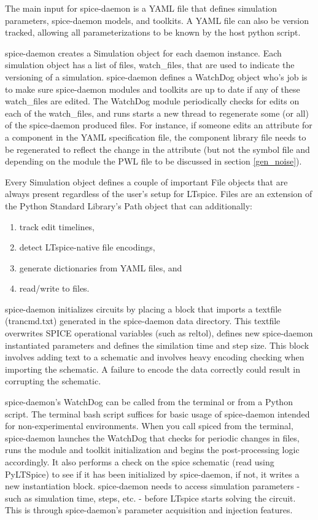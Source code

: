 \documentclass[]{article}
\newcommand{\todoidea}[2][]{}
\newcommand{\cf}[1]{\textsf{#1}}
\begin{document}
The main input for spice-daemon is a YAML file that defines simulation parameters, spice-daemon models, and
toolkits. A YAML file can also be version tracked, allowing all parameterizations to be known by the host
python script. 
\todoidea[]{cool because u can save runs behind hidden menus and monte carlo things}

spice-daemon creates a \cf{Simulation} object for each daemon instance. Each simulation
object has a list of files, \cf{watch\_files}, that are used to indicate the versioning
of a simulation. spice-daemon defines a \cf{WatchDog} object who's job is to make sure
spice-daemon modules and toolkits are up to date if any of these \cf{watch\_files}
are edited. 
The \cf{WatchDog} module periodically checks for edits on each of the \cf{watch\_files},
and runs starts a new thread to regenerate some (or all) of the spice-daemon produced files.
For instance, if someone edits an attribute for a component in the YAML specification file, 
the component library file needs to be regenerated to reflect the change in the attribute (but not the symbol file and depending on the module the PWL file to be discussed in section \ref{gen_noise}).

Every \cf{Simulation} object defines a couple of important \cf{File} objects that are always present regardless
of the user's setup for LTspice. \cf{File}s are an extension of the Python Standard Library's \cf{Path} object that can additionally:
\begin{enumerate}
    \item track edit timelines,
    \item detect LTspice-native file encodings,
    \item generate dictionaries from YAML files, and
    \item read/write to files.
\end{enumerate}

spice-daemon initializes circuits by placing a block that imports a textfile (\cf{trancmd.txt}) 
generated
in the spice-daemon data directory. This textfile overwrites SPICE operational variables
(such as \cf{reltol}), defines new spice-daemon instantiated parameters and defines the
similation time and step size. This block involves adding text to a schematic and involves
heavy encoding checking when importing the schematic. A failure to encode the data correctly
could result in corrupting the schematic.

spice-daemon's \cf{WatchDog} can be called from the terminal or from a Python script. The terminal
bash script suffices for basic usage of spice-daemon intended for non-experimental environments.
When you call \cf{spiced} from the terminal, spice-daemon launches the \cf{WatchDog} that checks for 
periodic changes in files, runs the module and toolkit initialization and begins the post-processing logic
accordingly. It also performs a check on the spice schematic (read using \cf{PyLTSpice})
to see if it has been initialized
by spice-daemon, if not, it writes a new instantiation block.
spice-daemon needs to access simulation parameters - such as simulation time, steps, etc. -
before LTspice starts solving the circuit. This is through spice-daemon's parameter acquisition and injection 
features. 
\end{document}
